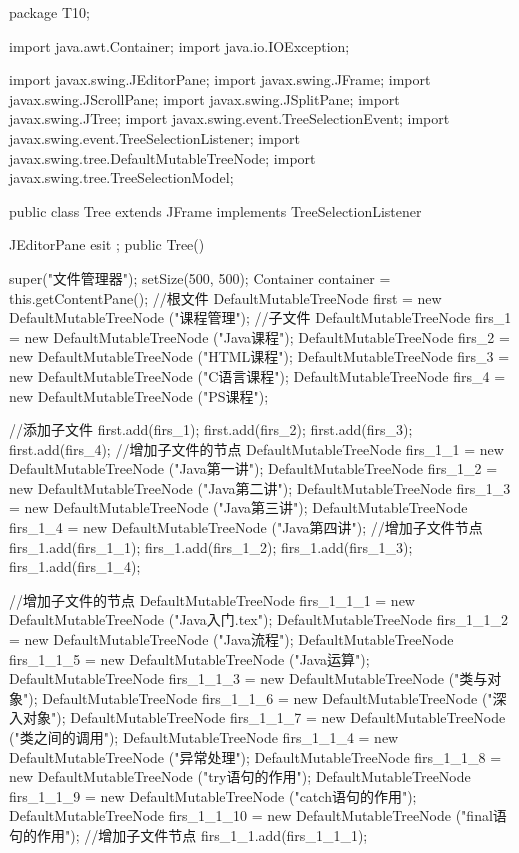 package T10;

import java.awt.Container;
import java.io.IOException;

import javax.swing.JEditorPane;
import javax.swing.JFrame;
import javax.swing.JScrollPane;
import javax.swing.JSplitPane;
import javax.swing.JTree;
import javax.swing.event.TreeSelectionEvent;
import javax.swing.event.TreeSelectionListener;
import javax.swing.tree.DefaultMutableTreeNode;
import javax.swing.tree.TreeSelectionModel;

public class Tree extends JFrame implements TreeSelectionListener{
	JEditorPane esit ;
	public Tree() {
		super("文件管理器");
		setSize(500, 500);
		Container container = this.getContentPane();
		//根文件
		DefaultMutableTreeNode  first = new DefaultMutableTreeNode ("课程管理");
		//子文件
		DefaultMutableTreeNode  firs_1 = new DefaultMutableTreeNode ("Java课程");
		DefaultMutableTreeNode  firs_2 = new DefaultMutableTreeNode ("HTML课程");
		DefaultMutableTreeNode  firs_3 = new DefaultMutableTreeNode ("C语言课程");
		DefaultMutableTreeNode  firs_4 = new DefaultMutableTreeNode ("PS课程");
		
		//添加子文件
		first.add(firs_1);
		first.add(firs_2);
		first.add(firs_3);
		first.add(firs_4);
		//增加子文件的节点
		DefaultMutableTreeNode  firs_1_1 = new DefaultMutableTreeNode ("Java第一讲");
		DefaultMutableTreeNode  firs_1_2 = new DefaultMutableTreeNode ("Java第二讲");
		DefaultMutableTreeNode  firs_1_3 = new DefaultMutableTreeNode ("Java第三讲");
		DefaultMutableTreeNode  firs_1_4 = new DefaultMutableTreeNode ("Java第四讲");
		//增加子文件节点
		firs_1.add(firs_1_1);
		firs_1.add(firs_1_2);
		firs_1.add(firs_1_3);
		firs_1.add(firs_1_4);
		
		//增加子文件的节点
		DefaultMutableTreeNode  firs_1_1_1 = new DefaultMutableTreeNode ("Java入门.tex");
		DefaultMutableTreeNode  firs_1_1_2 = new DefaultMutableTreeNode ("Java流程");
		DefaultMutableTreeNode  firs_1_1_5 = new DefaultMutableTreeNode ("Java运算");
		DefaultMutableTreeNode  firs_1_1_3 = new DefaultMutableTreeNode ("类与对象");
		DefaultMutableTreeNode  firs_1_1_6 = new DefaultMutableTreeNode ("深入对象");
		DefaultMutableTreeNode  firs_1_1_7 = new DefaultMutableTreeNode ("类之间的调用");
		DefaultMutableTreeNode  firs_1_1_4 = new DefaultMutableTreeNode ("异常处理");
		DefaultMutableTreeNode  firs_1_1_8 = new DefaultMutableTreeNode ("try语句的作用");
		DefaultMutableTreeNode  firs_1_1_9 = new DefaultMutableTreeNode ("catch语句的作用");
		DefaultMutableTreeNode  firs_1_1_10 = new DefaultMutableTreeNode ("final语句的作用");
		//增加子文件节点
		firs_1_1.add(firs_1_1_1);
		
}}
